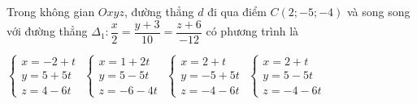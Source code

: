 \documentclass[12pt,a4paper]{article}
\begin{document}
\begin{ex}
 Trong không gian ${Oxyz}$, đường thẳng ${d}$ đi qua điểm ${C(2;-5;-4)}$ và song song với đường thẳng $\Delta_1:\dfrac{x}{2}=\dfrac{y + 3}{10}=\dfrac{z + 6}{-12}$ có phương trình là
 
\choice
{ $\left\{ \begin{array}{l}x = -2+t\\ y = 5+5t\\z = 4-6t\end{array} \right.$ }
   { $\left\{ \begin{array}{l}x = 1+2t\\ y = 5-5t\\z = -6-4t\end{array} \right.$ }
     { \True $\left\{ \begin{array}{l}x = 2+t\\ y = -5+5t\\z = -4-6t\end{array} \right.$ }
    { $\left\{ \begin{array}{l}x = 2+t\\ y = 5-5t\\z = -4-6t\end{array} \right.$ }
\end{ex}
\end{document}
